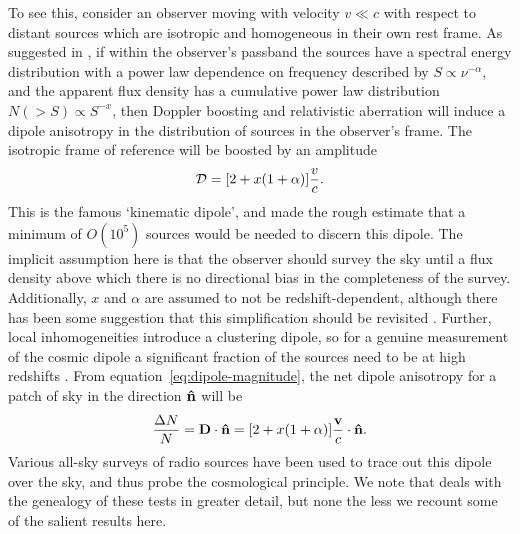 \documentclass[fleqn,usenatbib]{mnras}
\begin{document}
    To see this, consider an observer moving with velocity $v \ll c$ with respect to distant sources which are isotropic and homogeneous in their own rest frame.
    As suggested in \cite{ellis1984}, if within the observer's passband the sources have a spectral energy distribution with a power law dependence on frequency described by $S \propto \nu ^{-\alpha}$, and the apparent flux density has a cumulative power law distribution $N(>S) \propto S^{-x}$, then Doppler boosting and relativistic aberration will induce a dipole anisotropy in the distribution of sources in the observer's frame.
    The isotropic frame of reference will be boosted by an amplitude
    \begin{equation}
        {\bf \mathcal{D}} = [2 + x(1+\alpha)]\frac{v}{c}. \label{eq:dipole-magnitude}
    \end{equation}
    This is the famous `kinematic dipole', and \citet{ellis1984} made the rough estimate that a minimum of $O(10^{5})$ sources would be needed to discern this dipole.
    The implicit assumption here is that the observer should survey the sky until a flux density above which there is no directional bias in the completeness of the survey.
    Additionally, $x$ and $\alpha$ are assumed to not be redshift-dependent, although there has been some suggestion that this simplification should be revisited \citep[see e.g.][]{dalang2022}.
    Further, local inhomogeneities introduce a clustering dipole, so for a genuine measurement of the cosmic dipole a significant fraction of the sources need to be at high redshifts \citep[$z\approx 1$;][]{tiwari2016}.
    From equation~\eqref{eq:dipole-magnitude}, the net dipole anisotropy for a patch of sky in the direction $\bf \hat{n}$ will be
    \begin{equation}
        \frac{\Delta N}{N} = {\bf D}\cdot{\bf \hat{n}} = [2 + x(1+\alpha)]\frac{\bf v}{c}\cdot{\bf \hat{n}}. \label{eq:E&B-dipole}
    \end{equation}
    Various all-sky surveys of radio sources have been used to trace out this dipole over the sky, and thus probe the cosmological principle.
    We note that \citet{aluri2023} deals with the genealogy of these tests in greater detail, but none the less we recount some of the salient results here.
    
\end{document}
